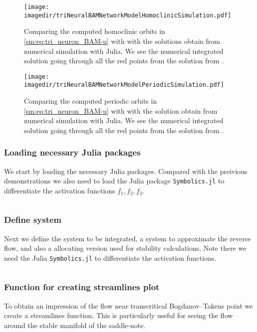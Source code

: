 \begin{figure}[ht]
    \texttt{[image: \\imagedir/triNeuralBAMNetworkModelHomoclinicSimulation.pdf]}
    \caption{Comparing the computed homoclinic orbits in \cref{sm:eq:tri_neuron_BAM-u}
    with \DDEBIFTOOL with the solutions obtain from numerical simulation with Julia.
    We see the numerical integrated solution
    going through all the red points from the solution from \DDEBIFTOOL.}
    \label{sm:fig:triNeuralBAMNetworkSimulationHomoclinic}
\end{figure}

\begin{figure}[ht]
    \texttt{[image: \\imagedir/triNeuralBAMNetworkModelPeriodicSimulation.pdf]}
    \caption{Comparing the computed periodic orbits in \cref{sm:eq:tri_neuron_BAM-u}
    with \DDEBIFTOOL with the solution obtain from numerical simulation with Julia.
    We see the numerical integrated solution
    going through all the red points from the solution from \DDEBIFTOOL.}
    \label{sm:fig:triNeuralBAMNetworkSimulationPeriodic}
\end{figure}

\subsubsection{Loading necessary Julia packages}
We start by loading the necessary Julia packages. Compared with the preivious
demonstrations we also need to load the Julia package {\tt Symbolics.jl} to
differentiate the activation functions $f_1,f_2,f_3$.
\inputminted[firstline=1, lastline=9]{julia}{\pathToJuliaFiles/triNeuralBAMNetworkModel_simulation_article.jl}

\subsubsection{Define system}
Next we define the system to be integrated, a system to approximate the reverse
flow, and also a allocating version used for stability calculations. Note there
we need the Julia {\tt Symbolics.jl} to differentiate the activation functions.
\inputminted[firstline=11, lastline=63]{julia}{\pathToJuliaFiles/triNeuralBAMNetworkModel_simulation_article.jl}

\subsubsection{Function for creating streamlines plot}
To obtain an impression of the flow near transcritical Bogdanov--Takens point
we create a streamlines function. This is particularly useful for seeing the
flow around the stable manifold of the saddle-note.
\inputminted[firstline=65, lastline=77]{julia}{\pathToJuliaFiles/triNeuralBAMNetworkModel_simulation_article.jl}

